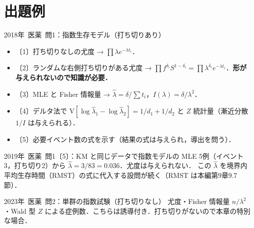 \documentclass[a4paper,11pt,openany]{ltjsbook}
\newcommand{\kakomon}[2]{\mbox{#1年 医薬 問#2}}
\newcommand{\V}{\mathrm{V}}
\begin{document}
\section{出題例}\label{sec:m01-shutsudai}
\begin{shutsudai}{\kakomon{2018}{1}：指数生存モデル（打ち切りあり）}
\begin{itemize}
\item 〔1〕打ち切りなしの尤度 → $\prod\lambda e^{-\lambda t_i}$．
\item 〔2〕ランダムな右側打ち切りがある尤度 → $\prod f^{\delta_i}S^{1-\delta_i}=\prod\lambda^{\delta_i}e^{-\lambda t_i}$．\textbf{形が与えられないので知識が必要．}
\item 〔3〕MLE と Fisher 情報量 → $\hat\lambda=\delta/\sum t_i$，$I(\lambda)=\delta/\lambda^2$．
\item 〔4〕デルタ法で $\V[\log\hat\lambda_1-\log\hat\lambda_2]=1/d_1+1/d_2$ と $Z$ 統計量（漸近分散 $1/I$ は与えられる）．
\item 〔5〕必要イベント数の式を示す（結果の式は与えられ，導出を問う）．
\end{itemize}
\end{shutsudai}
\begin{shutsudai}{\kakomon{2019}{1}〔5〕：KM と同じデータで指数モデルの MLE}
5例（イベント3，打ち切り2）から $\hat\lambda=3/83=0.036$．尤度は与えられない．
この $\hat\lambda$ を境界内平均生存時間（RMST）の式に代入する設問が続く（RMST は本編第9章9.7節）．
\end{shutsudai}
\begin{shutsudai}{\kakomon{2023}{2}：単群の指数試験（打ち切りなし）}
尤度・Fisher 情報量 $n/\lambda^2$・Wald 型 $Z$ による症例数．こちらは誘導付き．打ち切りがないので本章の特別な場合．
\end{shutsudai}

\end{document}
